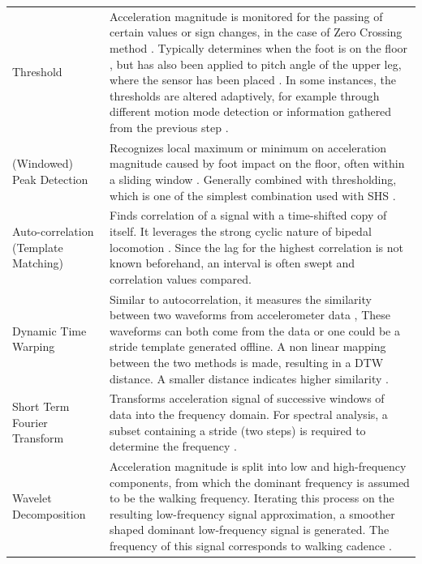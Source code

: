 	\begin{table}[h]
		\centering
		\footnotesize
		\begin{tabularx}{\linewidth}{@{} P{17mm} L}
			\toprule
				&   	\\
			\midrule			
			Threshold & Acceleration magnitude is monitored for the passing of certain values or sign changes, in the case of Zero Crossing method \cite{Davidson2017,Harle2013}. Typically determines when the foot is on the floor \cite{Harle2013}, but has also been applied to pitch angle of the upper leg, where the sensor has been placed \cite{Diaz2014a}. In some instances, the thresholds are altered adaptively, for example through different motion mode detection or information gathered from the previous step \cite{Wu2019}.\\ 
  (Windowed) Peak Detection & Recognizes local maximum or minimum on acceleration magnitude caused by foot impact on the floor, often within a sliding window \cite{Susi2013}. Generally combined with thresholding, which is one of the simplest combination used with \ac{SHS} \cite{Davidson2017}. \\ \hline
  Auto-correlation (Template Matching) &  Finds correlation of a signal with a time-shifted copy of itself. It leverages the strong cyclic nature of bipedal locomotion \cite{Harle2013}. Since the lag for the highest correlation is not known beforehand, an interval is often swept and correlation values compared. \\ \hline
  Dynamic Time Warping & Similar to autocorrelation, it measures the similarity between two waveforms from accelerometer data \cite{Davidson2017}, These waveforms can both come from the data or one could be a stride template generated offline. A non linear mapping between the two methods is made, resulting in a DTW distance. A smaller distance indicates higher similarity \cite{Davidson2017}.  \\ \hline
  Short Term Fourier Transform & Transforms acceleration signal of successive windows of data into the frequency domain. For spectral analysis, a subset containing a stride (two steps) is required to determine the frequency \cite{Harle2013}.  \\ \hline
  Wavelet Decomposition & Acceleration magnitude is split into low and high-frequency components, from which the dominant frequency is assumed to be the walking frequency. Iterating this process on the resulting low-frequency signal approximation, a smoother shaped dominant low-frequency signal is generated. The frequency of this signal corresponds to walking cadence \cite{Davidson2017}. \\ \hline	

\end{tabularx}
\end{table}
